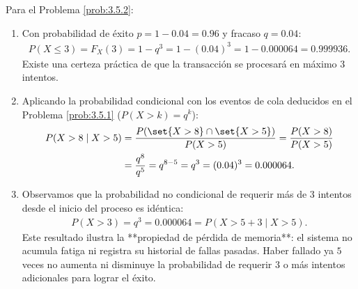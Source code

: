 \begin{solucion}
	\label{sol:3.5.2}
	Para el Problema \ref{prob:3.5.2}:
	\begin{enumerate}
		\item Con probabilidad de éxito $p = 1 - 0.04 = 0.96$ y fracaso $q = 0.04$:
		\begin{align*}
			P(X \le 3) = F_X(3) = 1 - q^3 = 1 - (0.04)^3 = 1 - 0.000064 = 0.999936.
		\end{align*}
		Existe una certeza práctica de que la transacción se procesará en máximo $3$ intentos.
		\item Aplicando la probabilidad condicional con los eventos de cola deducidos en el Problema \ref{prob:3.5.1} ($P(X > k) = q^k$):
		\begin{align*}
			P(X > 8 \mid X > 5) &= \dfrac{P(\set{X > 8} \cap \set{X > 5})}{P(X > 5)} = \dfrac{P(X > 8)}{P(X > 5)} \\
			&= \dfrac{q^8}{q^5} = q^{8-5} = q^3 = (0.04)^3 = 0.000064.
		\end{align*}
		\item Observamos que la probabilidad no condicional de requerir más de $3$ intentos desde el inicio del proceso es idéntica:
		\begin{align*}
			P(X > 3) = q^3 = 0.000064 = P(X > 5 + 3 \mid X > 5).
		\end{align*}
		Este resultado ilustra la **propiedad de pérdida de memoria**: el sistema no acumula fatiga ni registra su historial de fallas pasadas. Haber fallado ya $5$ veces no aumenta ni disminuye la probabilidad de requerir $3$ o más intentos adicionales para lograr el éxito.
	\end{enumerate}
\end{solucion}

